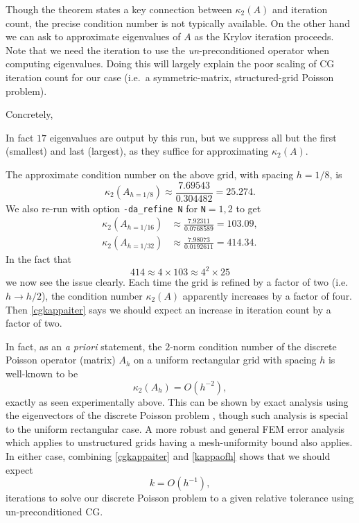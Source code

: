 Though the theorem states a key connection between $\kappa_2(A)$ and iteration count, the precise condition number is not typically available.  On the other hand we can ask \PETSc to approximate eigenvalues of $A$ as the Krylov iteration proceeds.  Note that we need the iteration to use the \emph{un}-preconditioned operator when computing eigenvalues.  Doing this will largely explain the poor scaling of CG iteration count for our case (i.e.~a symmetric-matrix, structured-grid Poisson problem).

Concretely,
In fact $17$ eigenvalues are output by this run, but we suppress all but the first (smallest) and last (largest), as they suffice for approximating $\kappa_2(A)$.

The approximate condition number on the above grid, with spacing $h=1/8$, is
    $$\kappa_2(A_{h=1/8}) \approx \frac{7.69543}{0.304482} = 25.274.$$
We also re-run with option \texttt{-da\_refine N} for \texttt{N}$=1,2$ to get
\begin{align*}
    \kappa_2(A_{h=1/16}) &\approx \frac{7.92311}{0.0768589} = 103.09, \\
    \kappa_2(A_{h=1/32}) &\approx \frac{7.98073}{0.0192611} = 414.34.
\end{align*}
In the fact that
    $$414 \approx 4 \times 103 \approx 4^2 \times 25$$
we now see the issue clearly.  Each time the grid is refined by a factor of two (i.e.~$h\to h/2$), the condition number $\kappa_2(A)$ apparently increases by a factor of four.  Then \eqref{cgkappaiter} says we should expect an increase in iteration count by a factor of two.

In fact, as an \emph{a priori} statement, the $2$-norm condition number of the discrete Poisson operator (matrix) $A_h$ on a uniform rectangular grid with spacing $h$ is well-known to be
\begin{equation}
    \kappa_2(A_h) = O(h^{-2}), \label{kappaofh}
\end{equation}
exactly as seen experimentally above.  This can be shown by exact analysis using the eigenvectors of the discrete Poisson problem \citep{Briggsetal2000,Elmanetal2005}, though such analysis is special to the uniform rectangular case.  A more robust and general FEM error analysis which applies to unstructured grids having a mesh-uniformity bound \citep{Elmanetal2005} also applies.  In either case, combining \eqref{cgkappaiter} and \eqref{kappaofh} shows that we should expect
\begin{equation}
    k = O(h^{-1}), \label{kofh}
\end{equation}
iterations to solve our discrete Poisson problem to a given relative tolerance using un-preconditioned CG.

